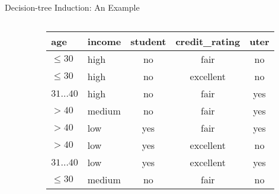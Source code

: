 \begin{frame}{Decision-tree Induction: An Example}
\begin{columns}
\begin{column}{0.4\textwidth}
\begin{itemize}
			\end{itemize}
		\end{column}
		\begin{column}{0.6\textwidth}
			\begin{tabular}{|l|l|c|c|c|}
				\hline
				\cellcolor{blue!20}age            & \cellcolor{blue!20}income   & \cellcolor{blue!20}student & \cellcolor{blue!20}credit\_rating & \cellcolor{blue!20}uter \\\hline
				\cellcolor{yellow!20}$\leq 30$    & \cellcolor{yellow!20}high   & \cellcolor{yellow!20}no    & \cellcolor{yellow!20}fair         & \cellcolor{red!20}no    \\\hline
				\cellcolor{yellow!20}$\leq 30$    & \cellcolor{yellow!20}high   & \cellcolor{yellow!20}no    & \cellcolor{yellow!20}excellent    & \cellcolor{red!20}no    \\\hline
				\cellcolor{yellow!20}$31\ldots40$ & \cellcolor{yellow!20}high   & \cellcolor{yellow!20}no    & \cellcolor{yellow!20}fair         & \cellcolor{green!20}yes \\\hline
				\cellcolor{yellow!20}$>40$        & \cellcolor{yellow!20}medium & \cellcolor{yellow!20}no    & \cellcolor{yellow!20}fair         & \cellcolor{green!20}yes \\\hline
				\cellcolor{yellow!20}$>40$        & \cellcolor{yellow!20}low    & \cellcolor{yellow!20}yes   & \cellcolor{yellow!20}fair         & \cellcolor{green!20}yes \\\hline
				\cellcolor{yellow!20}$>40$        & \cellcolor{yellow!20}low    & \cellcolor{yellow!20}yes   & \cellcolor{yellow!20}excellent    & \cellcolor{red!20}no    \\\hline
				\cellcolor{yellow!20}$31\ldots40$ & \cellcolor{yellow!20}low    & \cellcolor{yellow!20}yes   & \cellcolor{yellow!20}excellent    & \cellcolor{green!20}yes \\\hline
				\cellcolor{yellow!20}$\leq 30$    & \cellcolor{yellow!20}medium & \cellcolor{yellow!20}no    & \cellcolor{yellow!20}fair         & \cellcolor{red!20}no    \\\hline

\end{tabular}
\end{column}
\end{columns}
\end{frame}
